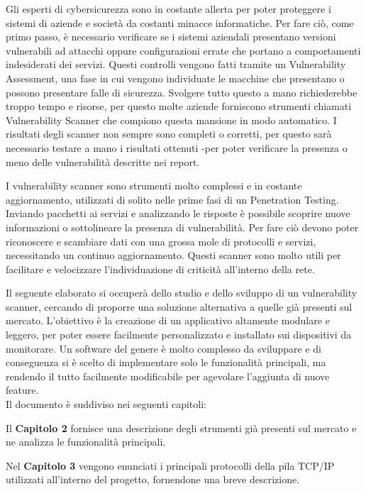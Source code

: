 \documentclass[12pt]{report}
\begin{document}
Gli esperti di cybersicurezza sono in costante allerta per poter proteggere i sistemi di aziende e società da costanti minacce informatiche. Per fare ciò, come primo passo, è necessario verificare se i sistemi aziendali presentano versioni vulnerabili ad attacchi oppure configurazioni errate che portano a comportamenti indesiderati dei servizi. Questi controlli vengono fatti tramite un Vulnerability Assessment, una fase in cui vengono individuate le macchine che presentano o possono presentare falle di sicurezza. Svolgere tutto questo a mano richiederebbe troppo tempo e risorse, per questo molte aziende forniscono strumenti chiamati Vulnerability Scanner che compiono questa mansione in modo automatico. I risultati degli scanner non sempre sono completi o corretti, per questo sarà necessario testare a mano i risultati ottenuti -per poter verificare la presenza o meno delle vulnerabilità descritte nei report.\cite{scarfone2008technical}

I vulnerability scanner sono strumenti molto complessi e in costante aggiornamento, utilizzati di solito nelle prime fasi di un Penetration Testing. Inviando pacchetti ai servizi e analizzando le risposte è possibile scoprire nuove informazioni o sottolineare la presenza di vulnerabilità. Per fare ciò devono poter riconoscere e scambiare dati con una grossa mole di protocolli e servizi, necessitando un continuo aggiornamento. Questi scanner sono molto utili per facilitare e velocizzare l'individuazione di criticità all'interno della rete.

Il seguente elaborato si occuperà dello studio e dello sviluppo di un vulnerability scanner, cercando di proporre una soluzione alternativa a quelle già presenti sul mercato. L'obiettivo è la creazione di un applicativo altamente modulare e leggero, per poter essere facilmente personalizzato e installato sui dispositivi da monitorare. Un software del genere è molto complesso da sviluppare e di conseguenza si è scelto di implementare solo le funzionalità principali, ma rendendo il tutto facilmente modificabile per agevolare l'aggiunta di nuove feature.\\
Il documento è suddiviso nei seguenti capitoli:

Il \textbf{Capitolo 2} fornisce una descrizione degli strumenti già presenti sul mercato e ne analizza le funzionalità principali. 

Nel \textbf{Capitolo 3} vengono enunciati i principali protocolli della pila TCP/IP utilizzati all'interno del progetto, fornendone una breve descrizione.
\end{document}

